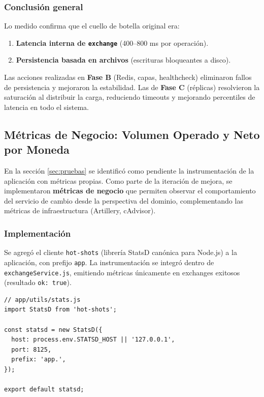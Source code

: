 \subsubsection{Conclusión general}

Lo medido confirma que el cuello de botella original era:

\begin{enumerate}[leftmargin=*]
    \item \textbf{Latencia interna de \texttt{exchange}} (400--800 ms por operación).
    \item \textbf{Persistencia basada en archivos} (escrituras bloqueantes a disco).
\end{enumerate}

Las acciones realizadas en \textbf{Fase B} (Redis, capas, healthcheck) eliminaron fallos de persistencia y mejoraron la estabilidad. Las de \textbf{Fase C} (réplicas) resolvieron la saturación al distribuir la carga, reduciendo timeouts y mejorando percentiles de latencia en todo el sistema.

\subsection{Métricas de Negocio: Volumen Operado y Neto por Moneda}
\label{subsec:metricas-negocio}

En la sección \ref{sec:pruebas} se identificó como pendiente la instrumentación de la aplicación con métricas propias. Como parte de la iteración de mejora, se implementaron \textbf{métricas de negocio} que permiten observar el comportamiento del servicio de cambio desde la perspectiva del dominio, complementando las métricas de infraestructura (Artillery, cAdvisor).

\subsubsection{Implementación}

Se agregó el cliente \texttt{hot-shots} (librería StatsD canónica para Node.js) a la aplicación, con prefijo \texttt{app}. La instrumentación se integró dentro de \texttt{exchangeService.js}, emitiendo métricas únicamente en exchanges exitosos (resultado \texttt{ok: true}).

\begin{verbatim}
// app/utils/stats.js
import StatsD from 'hot-shots';

const statsd = new StatsD({
  host: process.env.STATSD_HOST || '127.0.0.1',
  port: 8125,
  prefix: 'app.',
});

export default statsd;
\end{verbatim}

